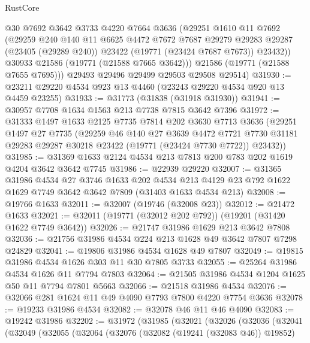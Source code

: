 \begin{lexlean}{RustCore}
\begin{coremodule}
          @30
          @7692
          @3642
          @3733
          @4220
          @7664
          @3636
          (@29251
            @1610
            @11
            @7692
            (@29259
              @240
              @140
              @11
              @6625
              @4472
              @7672
              @7687
              @29279
              @29283
              @29287
              (@23405 (@29289 @240))
              @23422
              (@19771 (@23424 @7687 @7673))
              @23432))
          @30933
          @21586
          (@19771 (@21588 @7665 @3642)))
        @21586
        (@19771 (@21588 @7655 @7695)))
      @29493
      @29496
      @29499
      @29503
      @29508
      @29514)
@31930 := @23211 @29220 @4534 @923 @13 @4460 (@23243 @29220 @4534 @920 @13 @4459 @23255)
@31933 := @31773 (@31838 (@31918 @31930))
@31941 := @30957 @7708 @1634 @1563 @213 @7738 @7815 @3642 @7396
@31972 := @31333
    @1497
    @1633
    @2125
    @7735
    @7814
    @202
    @3630
    @7713
    @3636
    (@29251
      @1497
      @27
      @7735
      (@29259
        @46
        @140
        @27
        @3639
        @4472
        @7721
        @7730
        @31181
        @29283
        @29287
        @30218
        @23422
        (@19771 (@23424 @7730 @7722))
        @23432))
@31985 := @31369 @1633 @2124 @4534 @213 @7813 @200 @783 @202 @1619 @4204 @3642 @3642 @7745
@31986 := @22939 @29220
@32007 := @31365
    @31986
    @4534
    @27
    @3746
    @1633
    @202
    @4534
    @213
    @4129
    @23
    @792
    @1622
    @1629
    @7749
    @3642
    @3642
    @7809
    (@31403 @1633 @4534 @213)
@32008 := @19766 @1633
@32011 := @32007 (@19746 (@32008 @23))
@32012 := @21472 @1633
@32021 := @32011 (@19771 (@32012 @202 @792)) (@19201 (@31420 @1622 @7749 @3642))
@32026 := @21747 @31986 @1629 @213 @3642 @7808
@32036 := @21756 @31986 @4534 @224 @213 @1628 @49 @3642 @7807 @7298 @24829
@32041 := @19806 @31986 @4534 @1628 @49 @7807
@32049 := @19815 @31986 @4534 @1626 @303 @11 @30 @7805 @3733
@32055 := @25264 @31986 @4534 @1626 @11 @7794 @7803
@32064 := @21505 @31986 @4534 @1204 @1625 @50 @11 @7794 @7801 @5663
@32066 := @21518 @31986 @4534
@32076 := @32066 @281 @1624 @11 @49 @4090 @7793 @7800 @4220 @7754 @3636
@32078 := @19233 @31986 @4534
@32082 := @32078 @46 @11 @46 @4090
@32083 := @19242 @31986
@32202 := @31972
    (@31985
      (@32021
        (@32026
          (@32036
            (@32041
              (@32049
                (@32055
                  (@32064
                    (@32076
                      (@32082 (@19241 (@32083 @46)) @19852)

\end{coremodule}
\end{lexlean}
